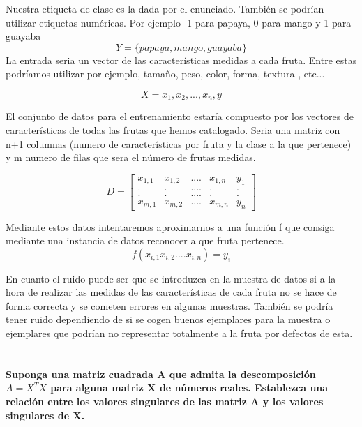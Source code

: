 \documentclass[titlepage]{article}
\begin{document}
  	Nuestra etiqueta de clase es la dada por el enunciado. También se podrían utilizar etiquetas numéricas. Por ejemplo -1 para papaya, 0 para mango y 1 para guayaba
  	$$
  	Y = \{papaya,mango,guayaba\}
  	$$
  	La entrada seria un vector de las características medidas a cada fruta. Entre estas podríamos utilizar por ejemplo, tamaño, peso, color, forma, textura , etc... 
  	
  	$$
  	X = {x_1,x_2,..., x_n, y} 
  	$$
  	
  	El conjunto de datos para el entrenamiento estaría compuesto por los vectores de características de todas las frutas que hemos catalogado. Seria una matriz con n+1 columnas (numero de características por fruta y la clase a la que pertenece) y m numero de filas que sera el número de frutas medidas.
  	
  	\[
  	D=
  	\begin{bmatrix}
  	x_{1,1} & x_{1,2} & .... & x_{1,n} & y_1 \\
  	. & . & .... & . & .\\	
  	. & . & .... & . & .\\	
  	x_{m,1} & x_{m,2} & .... & x_{m,n} & y_n
  	\end{bmatrix}
  	\]
  	
  	Mediante estos datos intentaremos aproximarnos a una función f que consiga mediante una instancia de datos reconocer a que fruta pertenece.
  	$$
  	f(x_{i,1}  x_{i,2}  ....  x_{i,n}) = y_i
  	$$
  	
  	En cuanto el ruido puede ser que se introduzca en la muestra de datos si a la hora de realizar las medidas de las características de cada fruta no se hace de forma correcta y se cometen errores en algunas muestras. También se podría tener ruido dependiendo de si se cogen buenos ejemplares para la muestra o ejemplares que podrían no representar totalmente a la fruta por defectos de esta.
  	
  	\section{}
  	\textbf{Suponga una matriz cuadrada A que admita la descomposición $A = X^TX$ para alguna
  	matriz X de números reales. Establezca una relación entre los valores singulares de las
  	matriz A y los valores singulares de X.}
  
  	\section{}
  	
\end{document}
